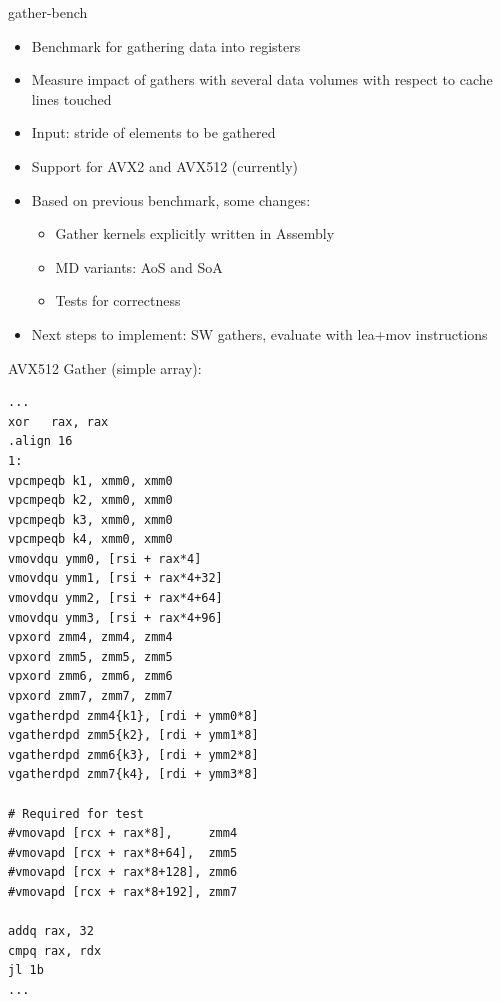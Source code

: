 \documentclass[aspectratio=169,t]{beamer}
\begin{document}
  \begin{frame}[fragile]{gather-bench}
    \begin{itemize}
      \item Benchmark for gathering data into registers
      \item Measure impact of gathers with several data volumes with respect to cache lines touched
      \item Input: stride of elements to be gathered
      \item Support for AVX2 and AVX512 (currently)
      \item Based on previous benchmark, some changes:
      \begin{itemize}
        \item Gather kernels explicitly written in Assembly
        \item MD variants: AoS and SoA
        \item Tests for correctness
      \end{itemize}
      \item Next steps to implement: SW gathers, evaluate with lea+mov instructions
    \end{itemize}
  \end{frame}

  \begin{frame}[fragile]{AVX512 Gather (simple array):}
    \vspace{-17.5pt}
    \begin{lstlisting}[language={[x64]Assembler},basicstyle=\tt\tiny]
...
xor   rax, rax
.align 16
1:
vpcmpeqb k1, xmm0, xmm0
vpcmpeqb k2, xmm0, xmm0
vpcmpeqb k3, xmm0, xmm0
vpcmpeqb k4, xmm0, xmm0
vmovdqu ymm0, [rsi + rax*4]
vmovdqu ymm1, [rsi + rax*4+32]
vmovdqu ymm2, [rsi + rax*4+64]
vmovdqu ymm3, [rsi + rax*4+96]
vpxord zmm4, zmm4, zmm4
vpxord zmm5, zmm5, zmm5
vpxord zmm6, zmm6, zmm6
vpxord zmm7, zmm7, zmm7
vgatherdpd zmm4{k1}, [rdi + ymm0*8]
vgatherdpd zmm5{k2}, [rdi + ymm1*8]
vgatherdpd zmm6{k3}, [rdi + ymm2*8]
vgatherdpd zmm7{k4}, [rdi + ymm3*8]

# Required for test
#vmovapd [rcx + rax*8],     zmm4
#vmovapd [rcx + rax*8+64],  zmm5
#vmovapd [rcx + rax*8+128], zmm6
#vmovapd [rcx + rax*8+192], zmm7

addq rax, 32
cmpq rax, rdx
jl 1b
...
    \end{lstlisting}
  \end{frame}
\end{document}
